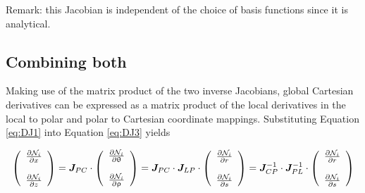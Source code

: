 Remark: this Jacobian is independent of the choice of basis functions since it is analytical.


\subsection{Combining both}

Making use of the matrix product of the two inverse Jacobians,
global Cartesian derivatives can be expressed as a matrix product of the local derivatives in the local to polar and polar to Cartesian coordinate mappings. Substituting Equation \eqref{eq:DJ1} into Equation \eqref{eq:DJ3} yields

\begin{equation}
\left(
\begin{array}{c}
\frac{\partial {\mathcal{N}}_i}{\partial x} \\ \\
\frac{\partial {\mathcal{N}}_i}{\partial z} 
\end{array}
\right)
= 
{\bm J}_{PC} \cdot 
\left(
\begin{array}{c}
\frac{\partial {\mathcal{N}}_i}{\partial \uptheta} \\ \\
\frac{\partial {\mathcal{N}}_i}{\partial \uprho} 
\end{array}
\right)
=
{\bm J}_{PC} \cdot 
{\bm J}_{LP} \cdot 
\left(
\begin{array}{c}
\frac{\partial {\mathcal{N}}_i}{\partial r} \\ \\
\frac{\partial {\mathcal{N}}_i}{\partial s} 
\end{array}
\right)
=
{\bm J}_{CP}^{-1} \cdot 
{\bm J}_{PL}^{-1} \cdot 
\left(
\begin{array}{c}
\frac{\partial {\mathcal{N}}_i}{\partial r} \\ \\
\frac{\partial {\mathcal{N}}_i}{\partial s} 
\end{array}
\right)
\label{eq:DJ123}
\end{equation}

